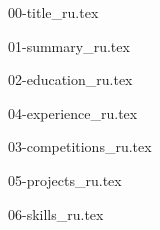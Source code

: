 \documentclass[letterpaper,11pt]{article}
\begin{document}

{00-title_ru.tex}

{01-summary_ru.tex}

{02-education_ru.tex}


{04-experience_ru.tex}

{03-competitions_ru.tex}

{05-projects_ru.tex}


{06-skills_ru.tex}



\vfill
{}
\end{document}
